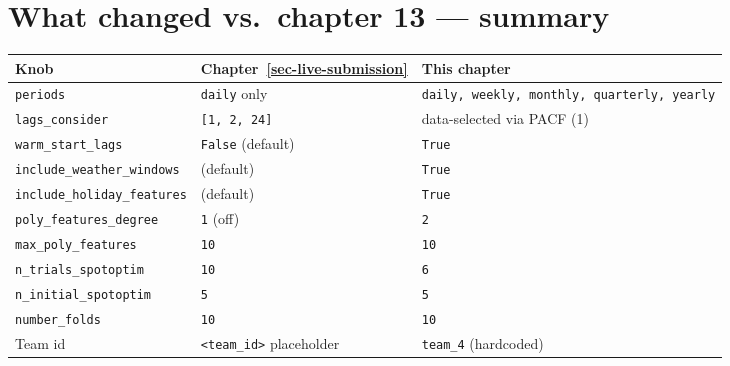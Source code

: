 \documentclass[
  english,
  letterpaper,
]{scrbook}
\newcounter{none} %
\begin{document}
\section{What changed vs.~chapter 13 ---
summary}\label{sec-team4-summary}

{\def\LTcaptype{none} %
\begin{longtable}[]{@{}
  >{\raggedright\arraybackslash}p{}
  >{\raggedright\arraybackslash}p{}
  >{\raggedright\arraybackslash}p{}@{}}
\toprule\noalign{}
\begin{minipage}[b]{\linewidth}\raggedright
Knob
\end{minipage} & \begin{minipage}[b]{\linewidth}\raggedright
Chapter~\ref{sec-live-submission}
\end{minipage} & \begin{minipage}[b]{\linewidth}\raggedright
This chapter
\end{minipage} \\
\midrule\noalign{}
\endhead
\bottomrule\noalign{}
\endlastfoot
\texttt{periods} & \texttt{daily} only &
\texttt{daily,\ weekly,\ monthly,\ quarterly,\ yearly} \\
\texttt{lags\_consider} & \texttt{{[}1,\ 2,\ 24{]}} & data-selected via
PACF (1) \\
\texttt{warm\_start\_lags} & \texttt{False} (default) & \texttt{True} \\
\texttt{include\_weather\_windows} & (default) & \texttt{True} \\
\texttt{include\_holiday\_features} & (default) & \texttt{True} \\
\texttt{poly\_features\_degree} & \texttt{1} (off) & \texttt{2} \\
\texttt{max\_poly\_features} & \texttt{10} & \texttt{10} \\
\texttt{n\_trials\_spotoptim} & \texttt{10} & \texttt{6} \\
\texttt{n\_initial\_spotoptim} & \texttt{5} & \texttt{5} \\
\texttt{number\_folds} & \texttt{10} & \texttt{10} \\
Team id & \texttt{\textless{}team\_id\textgreater{}} placeholder &
\texttt{team\_4} (hardcoded) \\
\end{longtable}
}
\end{document}
